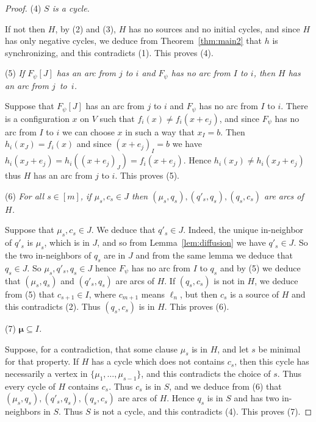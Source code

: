 \documentclass[11pt,letter]{article}
\newcommand{\MU}{\boldsymbol{\mu}}
\begin{document}
\begin{proof}
\bigskip
\noindent
(4) {\em $S$ is a cycle.}

\medskip
\noindent
If not then $H$, by (2) and (3), $H$ has no sources and no initial cycles, and since $H$ has only negative cycles, we deduce from Theorem~\ref{thm:main2} that $h$ is synchronizing, and this contradicts (1). This proves (4). 

\bigskip
\noindent
(5) {\em If $F_\psi[J]$ has an arc from $j$ to $i$ and $F_\psi$ has no arc from $I$ to $i$, then $H$ has an arc from $j$~to~$i$.}

\medskip
\noindent
Suppose that $F_\psi[J]$ has an arc from $j$ to $i$ and $F_\psi$ has no arc from $I$ to $i$. There is a configuration $x$ on $V$ such that $f_i(x)\neq f_i(x+e_j)$, and since $F_\psi$ has no arc from $I$ to $i$ we can choose $x$ in such a way that $x_I=b$. Then $h_i(x_J)=f_i(x)$ and since $(x+e_j)_I=b$ we have $h_i(x_J+e_j)=h_i((x+e_j)_J)=f_i(x+e_j)$. Hence $h_i(x_J)\neq h_i(x_J+e_j)$ thus $H$ has an arc from $j$ to $i$. This proves (5). 

\bigskip
\noindent
(6) {\em For all $s\in [m]$, if $\mu_s,c_s\in J$ then $(\mu_s,q_s),(q'_s,q_s),(q_s,c_s)$ are arcs of $H$.}

\medskip
\noindent
Suppose that $\mu_s,c_s\in J$. We deduce that $q'_s\in J$. Indeed, the unique in-neighbor of $q'_s$ is $\mu_s$, which is in $J$, and so from Lemma~\ref{lem:diffusion} we have $q'_s\in J$. So the two in-neighbors of $q_s$  are in $J$ and from the same lemma we deduce that $q_s\in J$. So $\mu_s,q'_s,q_s\in J$ hence $F_\psi$ has no arc from $I$ to $q_s$ and by (5) we deduce that $(\mu_s,q_s)$ and $(q'_s,q_s)$ are arcs of $H$. If $(q_s,c_s)$ is not in $H$, we deduce from (5) that $c_{s+1}\in I$, where $c_{m+1}$ means $\ell_n$, but then $c_s$ is a source of $H$ and this contradicts (2). Thus $(q_s,c_s)$ is in $H$. This proves (6).

\bigskip
\noindent
(7) {\em $\MU\subseteq I$.}

\medskip
\noindent
Suppose, for a contradiction, that some clause $\mu_s$ is in $H$, and let $s$ be minimal for that property. If $H$ has a cycle which does not contains $c_s$, then this cycle has necessarily a vertex in $\{\mu_1,\dots,\mu_{s-1}\}$, and this contradicts the choice of $s$. Thus every cycle of $H$ contains $c_s$. Thus $c_s$ is in $S$, and we deduce from (6) that $(\mu_s,q_s),(q'_s,q_s),(q_s,c_s)$ are arcs of $H$. Hence $q_s$ is in $S$  and has two in-neighbors in $S$. Thus $S$ is not a cycle, and this contradicts (4). This proves (7).


\end{proof}
\end{document}
